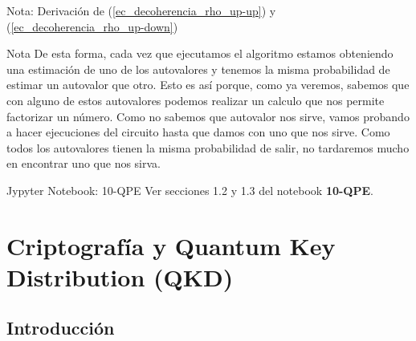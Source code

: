 \documentclass[a4paper,11pt]{book} %
\numberwithin{equation}{chapter}
\begin{document}
\begin{mybox_blue}{Nota: Derivación de (\ref{ec_decoherencia_rho_up-up}) y  (\ref{ec_decoherencia_rho_up-down})}
\begin{mybox_blue}{Nota}
	De esta forma, cada vez que ejecutamos el algoritmo estamos obteniendo una estimación de uno de los autovalores y tenemos la misma probabilidad de estimar un autovalor que otro. Esto es así porque, como ya veremos, sabemos que con alguno de estos autovalores podemos realizar un calculo que nos permite factorizar un número. Como no sabemos que autovalor nos sirve, vamos probando a hacer ejecuciones del circuito hasta que damos con uno que nos sirve. Como todos los autovalores tienen la misma probabilidad de salir, no tardaremos mucho en encontrar uno que nos sirva.
	\end{mybox_blue}

	
	\begin{mybox_orange}{Jypyter Notebook: 10-QPE}
	Ver secciones 1.2 y 1.3 del notebook \textbf{10-QPE}.
	\end{mybox_orange}









 



 




\chapter{Criptografía y Quantum Key Distribution (QKD)} \label{chapter_QKD}


\section{Introducción}


\end{mybox_blue}
\end{document}

